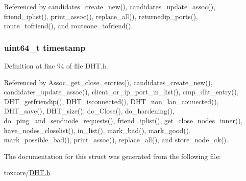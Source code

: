 Referenced by candidates\+\_\+create\+\_\+new(), candidates\+\_\+update\+\_\+assoc(), friend\+\_\+iplist(), print\+\_\+assoc(), replace\+\_\+all(), returnedip\+\_\+ports(), route\+\_\+tofriend(), and routeone\+\_\+tofriend().

\hypertarget{struct_i_p_p_ts_png_a465bef81f6478756e5443025b1f2ddfa}{
\subsubsection[{timestamp}]{\setlength{\rightskip}{0pt plus 5cm}uint64\+\_\+t timestamp}}\label{struct_i_p_p_ts_png_a465bef81f6478756e5443025b1f2ddfa}


Definition at line 94 of file D\+H\+T.\+h.



Referenced by Assoc\+\_\+get\+\_\+close\+\_\+entries(), candidates\+\_\+create\+\_\+new(), candidates\+\_\+update\+\_\+assoc(), client\+\_\+or\+\_\+ip\+\_\+port\+\_\+in\+\_\+list(), cmp\+\_\+dht\+\_\+entry(), D\+H\+T\+\_\+getfriendip(), D\+H\+T\+\_\+isconnected(), D\+H\+T\+\_\+non\+\_\+lan\+\_\+connected(), D\+H\+T\+\_\+save(), D\+H\+T\+\_\+size(), do\+\_\+\+Close(), do\+\_\+hardening(), do\+\_\+ping\+\_\+and\+\_\+sendnode\+\_\+requests(), friend\+\_\+iplist(), get\+\_\+close\+\_\+nodes\+\_\+inner(), have\+\_\+nodes\+\_\+closelist(), in\+\_\+list(), mark\+\_\+bad(), mark\+\_\+good(), mark\+\_\+possible\+\_\+bad(), print\+\_\+assoc(), replace\+\_\+all(), and store\+\_\+node\+\_\+ok().



The documentation for this struct was generated from the following file\+:\begin{DoxyCompactItemize}
\item 
toxcore/\hyperlink{_d_h_t_8h}{D\+H\+T.\+h}\end{DoxyCompactItemize}
